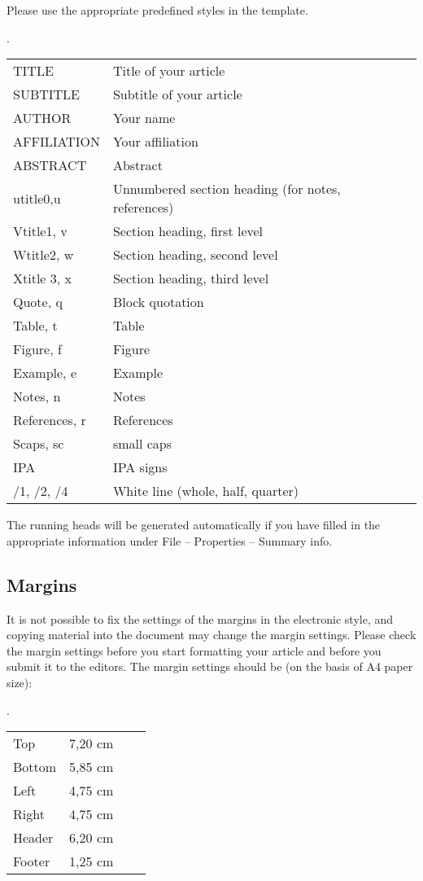 \documentclass[times,linguex]{lsb}
\begin{document}
Please use the appropriate predefined styles in the template.

\ex. \begin{tabular}[t]{llll@{\hskip 36pt}}
TITLE			& Title of your article\\
SUBTITLE		& Subtitle of your article\\
AUTHOR		& Your name\\
AFFILIATION	& Your affiliation\\
ABSTRACT	& 	Abstract\\
utitle0,u	& 	Unnumbered section heading (for notes, references)\\
Vtitle1, v	& 	Section heading, first level\\
Wtitle2, w	& 	Section heading, second level\\
Xtitle 3, x	& 	Section heading, third level\\
Quote, q	& 	Block quotation\\
Table, t	& 	Table\\
Figure, f	& 	Figure\\
Example, e	& 	Example\\
Notes, n	& 	Notes\\
References, r	& 	References\\
Scaps, sc	& 	small caps\\
IPA		& 	IPA signs \\
/1, /2, /4	& 	White line (whole, half, quarter)   \\
\end{tabular}

The running heads will be generated automatically if you have filled in the appropriate information under File – Properties – Summary info.


\subsection{Margins}

It is not possible to fix the settings of the margins in the electronic style, and copying material into the document may change the margin settings. Please check the margin settings before you start formatting your article and before you submit it to the editors. The margin settings should be (on the basis of A4 paper size):

\ex. \begin{tabular}[t]{llll@{\hskip 36pt}}
Top 	&	7,20 cm\\
Bottom &	5,85 cm\\
Left 	&	4,75 cm\\
Right &		4,75 cm\\
Header &	6,20 cm\\
Footer 	&	1,25 cm\\
\end{tabular}
\end{document}
